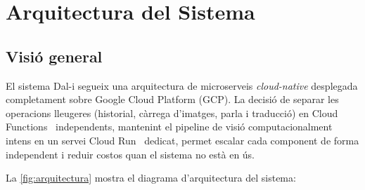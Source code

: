 \section{Arquitectura del Sistema}
\label{sec:arquitectura}

\subsection{Visió general}

El sistema Dal-i segueix una arquitectura de microserveis \textit{cloud-native} desplegada completament sobre Google Cloud Platform (GCP). La decisió de separar les operacions lleugeres (historial, càrrega d'imatges, parla i traducció) en Cloud Functions~\cite{cloudfunctions} independents, mantenint el pipeline de visió computacionalment intens en un servei Cloud Run~\cite{cloudrun} dedicat, permet escalar cada component de forma independent i reduir costos quan el sistema no està en ús.

La \cref{fig:arquitectura} mostra el diagrama d'arquitectura del sistema:

